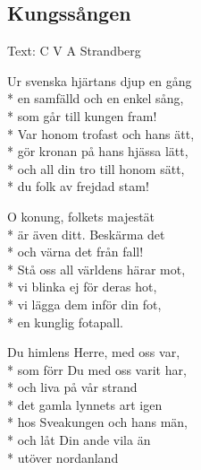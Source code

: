\begin{SongText}
\subsection{\textbf{Kungssången}}
\begin{SongInfo}
Text: C V A Strandberg
\end{SongInfo}
\begin{Verse}
Ur svenska hjärtans djup en gång\\*%
en samfälld och en enkel sång,\\*%
som går till kungen fram!\\*%
Var honom trofast och hans ätt,\\*%
gör kronan på hans hjässa lätt,\\*%
och all din tro till honom sätt,\\*%
du folk av frejdad stam!
\end{Verse}
\begin{Verse}
O konung, folkets majestät\\*%
är även ditt. Beskärma det\\*%
och värna det från fall!\\*%
Stå oss all världens härar mot,\\*%
vi blinka ej för deras hot,\\*%
vi lägga dem inför din fot,\\*%
en kunglig fotapall.
\end{Verse}
\begin{Verse}
Du himlens Herre, med oss var,\\*%
som förr Du med oss varit har,\\*%
och liva på vår strand\\*%
det gamla lynnets art igen\\*%
hos Sveakungen och hans män,\\*%
och låt Din ande vila än\\*%
utöver nordanland
\end{Verse}
\end{SongText}

